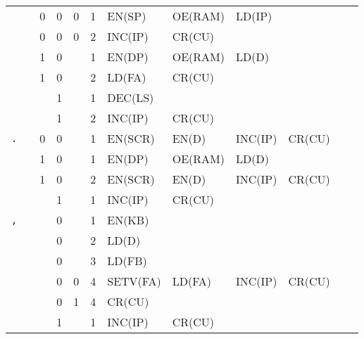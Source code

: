 \begin{longtable}[c] {c|cccc|c|llllll}
    \rowcolor{Gray}               &   & 0 & 0     & 0    & 1     & EN(SP)   & OE(RAM)  & LD(IP)  &        &        &        \\
    \rowcolor{Gray}               &   & 0 & 0     & 0    & 2     & INC(IP)  & CR(CU)   &         &        &        &        \\
    \rowcolor{White}              &   & 1 & 0     &      & 1     & EN(DP)   & OE(RAM)  & LD(D)   &        &        &        \\
    \rowcolor{White}              &   & 1 & 0     &      & 2     & LD(FA)   & CR(CU)   &         &        &        &        \\
    \rowcolor{Gray}               &   &   & 1     &      & 1     & DEC(LS)  &          &         &        &        &        \\ 
    \rowcolor{Gray}               &   &   & 1     &      & 2     & INC(IP)  & CR(CU)   &         &        &        &        \\ \hline
    
    \rowcolor{Gray}  \texttt{.}   &   & 0 & 0     &      & 1     & EN(SCR)  & EN(D)    & INC(IP) & CR(CU) &        &        \\
    \rowcolor{White}              &   & 1 & 0     &      & 1     & EN(DP)   & OE(RAM)  & LD(D)   &        &        &        \\
    \rowcolor{White}              &   & 1 & 0     &      & 2     & EN(SCR)  & EN(D)    & INC(IP) & CR(CU) &        &        \\
    \rowcolor{Gray}               &   &   & 1     &      & 1     & INC(IP)  & CR(CU)   &         &        &        &        \\ \hline
    
    \rowcolor{White} \texttt{,}   &   &   & 0     &      & 1     & EN(KB)   &          &         &        &        &        \\
    \rowcolor{White}              &   &   & 0     &      & 2     & LD(D)    &          &         &        &        &        \\
    \rowcolor{White}              &   &   & 0     &      & 3     & LD(FB)   &          &         &        &        &        \\    
    \rowcolor{White}              &   &   & 0     & 0    & 4     & SETV(FA) & LD(FA)   & INC(IP) & CR(CU) &        &        \\
    \rowcolor{Gray}               &   &   & 0     & 1    & 4     & CR(CU)   &          &         &        &        &        \\   
    \rowcolor{White}              &   &   & 1     &      & 1     & INC(IP)  & CR(CU)   &         &        &        &        \\ \hline
    

\end{longtable}

